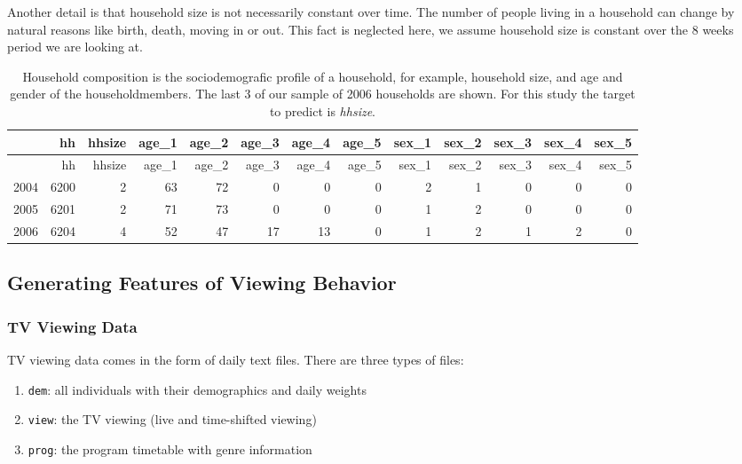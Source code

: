 \documentclass[]{article}
\providecommand{\tightlist}{%
  \setlength{\itemsep}{0pt}\setlength{\parskip}{0pt}}
\begin{document}
Another detail is that household size is not necessarily constant over
time. The number of people living in a household can change by natural
reasons like birth, death, moving in or out. This fact is neglected
here, we assume household size is constant over the 8 weeks period we
are looking at.

\begin{longtable}[]{@{}lrrrrrrrrrrrr@{}}
\caption{Household composition is the sociodemografic profile of a
household, for example, household size, and age and gender of the
householdmembers. The last 3 of our sample of 2006 households are shown.
For this study the target to predict is \emph{hhsize}.}\tabularnewline
\toprule
& hh & hhsize & age\_1 & age\_2 & age\_3 & age\_4 & age\_5 & sex\_1 &
sex\_2 & sex\_3 & sex\_4 & sex\_5\tabularnewline
\midrule
\endfirsthead
\toprule
& hh & hhsize & age\_1 & age\_2 & age\_3 & age\_4 & age\_5 & sex\_1 &
sex\_2 & sex\_3 & sex\_4 & sex\_5\tabularnewline
\midrule
\endhead
2004 & 6200 & 2 & 63 & 72 & 0 & 0 & 0 & 2 & 1 & 0 & 0 & 0\tabularnewline
2005 & 6201 & 2 & 71 & 73 & 0 & 0 & 0 & 1 & 2 & 0 & 0 & 0\tabularnewline
2006 & 6204 & 4 & 52 & 47 & 17 & 13 & 0 & 1 & 2 & 1 & 2 &
0\tabularnewline
\bottomrule
\end{longtable}

\hypertarget{generating-features-of-viewing-behavior}{%
\subsection{Generating Features of Viewing
Behavior}\label{generating-features-of-viewing-behavior}}

\hypertarget{tv-viewing-data}{%
\subsubsection{TV Viewing Data}\label{tv-viewing-data}}

TV viewing data comes in the form of daily text files. There are three
types of files:

\begin{enumerate}
\def\labelenumi{\arabic{enumi}.}
\tightlist
\item
  \texttt{dem}: all individuals with their demographics and daily
  weights
\item
  \texttt{view}: the TV viewing (live and time-shifted viewing)
\item
  \texttt{prog}: the program timetable with genre information
\end{enumerate}
\end{document}
